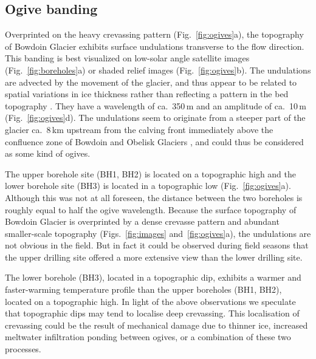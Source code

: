 \documentclass[utf8]{article}
\begin{document}
\subsection{Ogive banding}

    Overprinted on the heavy crevassing pattern (Fig.~\ref{fig:ogives}a), the
    topography of Bowdoin Glacier exhibits surface undulations transverse to
    the flow direction. This banding is best visualized on low-solar angle
    satellite images (Fig.~\ref{fig:boreholes}a) or shaded relief images
    (Fig.~\ref{fig:ogives}b). The undulations are advected by the movement of
    the glacier, and thus appear to be related to spatial variations in
    ice thickness rather than reflecting a pattern in the bed topography
    \citep[Fig.~\ref{fig:ogives}c; Fig.~3 of][]{Tsutaki.etal.2016}. They have a
    wavelength of ca.~350\,m and an amplitude of ca.~10\,m
    (Fig.~\ref{fig:ogives}d). The undulations seem to originate from a
    steeper part of the glacier ca.~8\,km upstream from the calving front
    immediately above the confluence zone of Bowdoin and Obelisk Glaciers
    \citep[Fig.~\ref{fig:images}a; Fig.~3 of ][]{Tsutaki.etal.2016}, and
    could thus be considered as some kind of ogives.

    The upper borehole site (BH1, BH2) is located on a topographic high and the
    lower borehole site (BH3) is located in a topographic low
    (Fig.~\ref{fig:ogives}a). Although this
    was not at all foreseen, the distance between the two boreholes is roughly
    equal to half the ogive wavelength. Because the surface topography of
    Bowdoin Glacier is overprinted by a dense crevasse pattern and abundant
    smaller-scale topography (Figs.~\ref{fig:images} and~\ref{fig:ogives}a),
    the undulations are not obvious in the field. But in fact it
    could be observed during field seasons that the upper drilling site offered
    a more extensive view than the lower drilling site.

    The lower borehole (BH3), located in a topographic dip, exhibits a warmer
    and faster-warming temperature profile than the upper boreholes (BH1, BH2),
    located on a topographic high. In light of the above observations we
    speculate that topographic dips may tend to localise deep
    crevassing. This localisation of crevassing
    could be the result of mechanical damage due to thinner ice, increased
    meltwater infiltration ponding between ogives, or a combination of these
    two processes.
\end{document}
